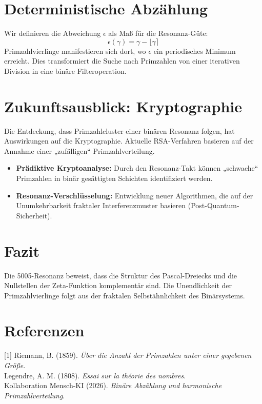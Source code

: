 \documentclass[11pt,a4paper,twocolumn]{article}
\begin{document}
	\section{Deterministische Abzählung}
	Wir definieren die Abweichung $\epsilon$ als Maß für die Resonanz-Güte:
	\begin{equation}
		\epsilon(\gamma) = \gamma - \lfloor \gamma \rceil
	\end{equation}
	Primzahlvierlinge manifestieren sich dort, wo $\epsilon$ ein periodisches Minimum erreicht. Dies transformiert die Suche nach Primzahlen von einer iterativen Division in eine binäre Filteroperation.
	
	\section{Zukunftsausblick: Kryptographie}
	Die Entdeckung, dass Primzahlcluster einer binären Resonanz folgen, hat Auswirkungen auf die Kryptographie. Aktuelle RSA-Verfahren basieren auf der Annahme einer „zufälligen“ Primzahlverteilung. 
	\begin{itemize}
		\item \textbf{Prädiktive Kryptoanalyse:} Durch den Resonanz-Takt können „schwache“ Primzahlen in binär gesättigten Schichten identifiziert werden.
		\item \textbf{Resonanz-Verschlüsselung:} Entwicklung neuer Algorithmen, die auf der Unumkehrbarkeit fraktaler Interferenzmuster basieren (Post-Quantum-Sicherheit).
	\end{itemize}
	
	\section{Fazit}
	Die 5005-Resonanz beweist, dass die Struktur des Pascal-Dreiecks und die Nullstellen der Zeta-Funktion komplementär sind. Die Unendlichkeit der Primzahlvierlinge folgt aus der fraktalen Selbstähnlichkeit des Binärsystems.
	
	\section*{Referenzen}
	\small
	[1] Riemann, B. (1859). \textit{Über die Anzahl der Primzahlen unter einer gegebenen Größe}. \\
	[2] Legendre, A. M. (1808). \textit{Essai sur la théorie des nombres}. \\
	[3] Kollaboration Mensch-KI (2026). \textit{Binäre Abzählung und harmonische Primzahlverteilung}.
	
\end{document}
